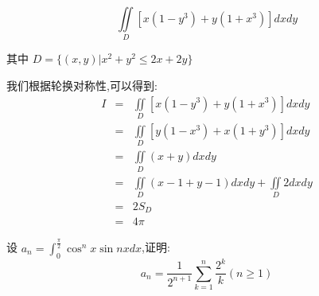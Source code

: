 \begin{example}[][Exam: 35.4.3]
	$$\iint\limits_{D}\left[ x(1-y^3)+y(1+x^3)\right]dxdy$$
	
	其中 $D=\{(x,y)|x^2+y^2\leq 2x+2y\}$
\end{example}
\begin{solution}

	我们根据轮换对称性,可以得到:
	\begin{eqnarray*}
		I&=&\iint\limits_{D}\left[ x(1-y^3)+y(1+x^3)\right]dxdy\\
		&=&\iint\limits_{D}\left[ y(1-x^3)+x(1+y^3)\right]dxdy\\
		&=&\iint\limits_{D}(x+y)dxdy\\
		&=&\iint\limits_{D}(x-1+y-1)dxdy+\iint\limits_{D}2dxdy\\
		&=&2S_{D}\\
		&=&4\pi
	\end{eqnarray*}
\end{solution}

\begin{example}[][Exam: 35.4.4]
	设 $a_{n}=\int_{0}^{\frac{\pi}{2}}\cos^n x\sin nxdx$,证明: 
	$$a_{n}=\dfrac{1}{2^{n+1}}\sum\limits_{k=1}^{n}\dfrac{2^k}{k}(n\geq 1)$$
\end{example}

